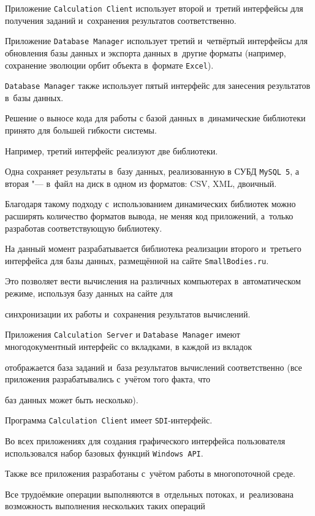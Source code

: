 Приложение {\tt Calculation Client} использует второй и~третий интерфейсы для получения заданий и~сохранения результатов соответственно. 

Приложение {\tt Database Manager} использует третий и~четвёртый интерфейсы для обновления базы данных и экспорта данных в~другие форматы (например, сохранение эволюции орбит объекта в~формате {\tt Excel}). 

{\tt Database Manager} также использует пятый интерфейс  для занесения результатов в~базы данных.



Решение о выносе кода для работы с базой данных в~динамические библиотеки принято для большей гибкости системы. 

Например, третий интерфейс реализуют две библиотеки. 

Одна сохраняет результаты в~базу данных, реализованную в СУБД {\tt MySQL 5}, а вторая "--- в~файл на диск в одном из форматов: CSV, XML, двоичный. 

Благодаря такому подходу с~использованием динамических библиотек можно расширять количество форматов вывода, не меняя код приложений, а~только разработав соответствующую библиотеку. 

На данный момент разрабатывается библиотека реализации второго и~третьего интерфейса для базы данных, размещённой на сайте {\tt SmallBodies.ru}.

Это позволяет вести вычисления на различных компьютерах в~автоматическом режиме, используя базу данных на сайте для

синхронизации их работы и~сохранения результатов вычислений.



Приложения {\tt Calculation Server} и {\tt Database Manager} имеют многодокументный интерфейс со вкладками, в каждой из вкладок

отображается база заданий и~база результатов вычислений соответственно (все приложения разрабатывались с~учётом того факта, что

баз данных может быть несколько). 

Программа {\tt Calculation Client} имеет {\tt SDI}-интерфейс. 

Во всех приложениях для создания графического интерфейса пользователя использовался набор базовых функций {\tt Windows API}.

Также все приложения разработаны с~учётом работы в многопоточной среде.

Все трудоёмкие операции выполняются в~отдельных потоках, и~реализована возможность выполнения нескольких таких операций


